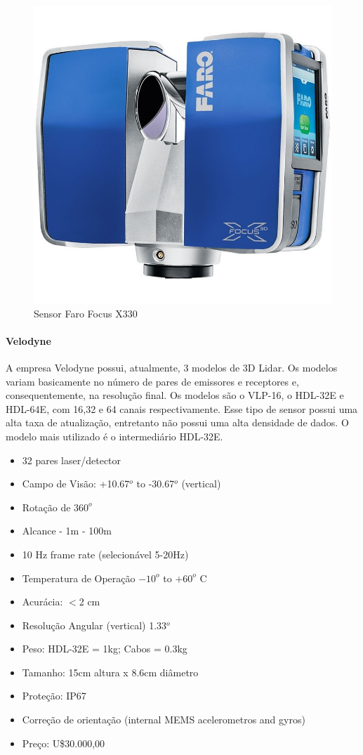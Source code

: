 \begin{figure}[h!]
	\centering	
	\includegraphics[width=0.5\columnwidth]{detail/figs/3dsensors/faro}
	\caption{Sensor Faro Focus X330}
    \label{fig::faro_focus}
\end{figure}


\paragraph{Velodyne}

A empresa Velodyne possui, atualmente, 3 modelos de 3D Lidar. Os modelos variam
basicamente no número de pares de emissores e receptores e, consequentemente, na
resolução final. Os modelos são o VLP-16, o HDL-32E e HDL-64E, com 16,32 e 64
canais respectivamente. Esse tipo de sensor possui uma alta taxa de
atualização, entretanto não possui uma alta densidade de dados. O modelo mais
utilizado é o intermediário HDL-32E.

\begin{itemize}
\item 32 pares laser/detector  
\item Campo de Visão: +10.67$^o$ to -30.67$^o$ (vertical)
\item Rotação de $360^o$
\item Alcance - 1m - 100m 
\item 10 Hz frame rate (selecionável 5-20Hz)
\item Temperatura de Operação $-10^o$ to $+60^o$ C
\item Acurácia: $<$2 cm
\item Resolução Angular (vertical) 1.33$^o$
\item Peso: HDL-32E = 1kg; Cabos = 0.3kg
\item Tamanho: 15cm altura x 8.6cm diâmetro
\item Proteção: IP67
\item Correção de orientação (internal MEMS acelerometros and gyros)
\item Preço: U\$30.000,00
\end{itemize}

